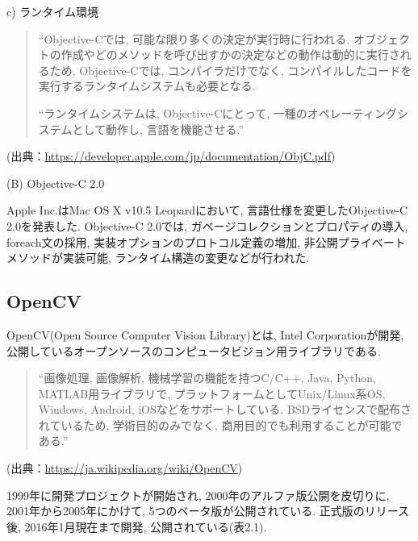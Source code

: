\begin{description}
\begin{description}
\item c) ランタイム環境

\begin{quotation}
\begin{screen}
“Objective-Cでは, 可能な限り多くの決定が実行時に行われる.
オブジェクトの作成やどのメソッドを呼び出すかの決定などの動作は動的に実行されるため, Objective-Cでは, コンパイラだけでなく, コンパイルしたコードを実行するランタイムシステムも必要となる.

“ランタイムシステムは, Objective-Cにとって, 一種のオペレーティングシステムとして動作し, 言語を機能させる.”
\end{screen}
\end{quotation}
\begin{flushright}
(出典：\url{https://developer.apple.com/jp/documentation/ObjC.pdf})
\end{flushright}

\end{description}

\item (B) Objective-C 2.0

Apple Inc.はMac OS X v10.5 Leopardにおいて, 言語仕様を変更したObjective-C 2.0を発表した.
Objective-C 2.0では, ガベージコレクションとプロパティの導入, foreach文の採用, 実装オプションのプロトコル定義の増加, 非公開プライベートメソッドが実装可能, ランタイム構造の変更などが行われた.
\end{description}

\subsection{OpenCV}
OpenCV(Open Source Computer Vision Library)とは, Intel Corporationが開発, 公開しているオープンソースのコンピュータビジョン用ライブラリである.

\begin{quotation}
\begin{screen}
“画像処理, 画像解析, 機械学習の機能を持つC/C++, Java, Python, MATLAB用ライブラリで, プラットフォームとしてUnix/Linux系OS, Windows, Android, iOSなどをサポートしている.
BSDライセンスで配布されているため, 学術目的のみでなく, 商用目的でも利用することが可能である.”
\end{screen}
\end{quotation}
\begin{flushright}
(出典：\url{https://ja.wikipedia.org/wiki/OpenCV})
\end{flushright}

1999年に開発プロジェクトが開始され, 2000年のアルファ版公開を皮切りに, 2001年から2005年にかけて, 5つのベータ版が公開されている.
正式版のリリース後, 2016年1月現在まで開発, 公開されている(表2.1).

